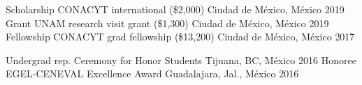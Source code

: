 \vspace{-5mm}
\begin{minipage}[t]{0.5\textwidth}
\begin{center}
\begin{cvhonors}
    \cvhonor
    {Scholarship}
    {CONACYT \textendash{} international (\approx\$2,000)}
    {Ciudad de México, México}
    {2019}
    \cvhonor
    {Grant}
    {UNAM research visit grant (\approx\$1,300)}
    {Ciudad de México, México}
    {2019}
    \cvhonor
    {Fellowship}
    {CONACYT grad fellowship (\approx\$13,200)}
    {Ciudad de México, México}
    {2017}
\end{cvhonors}
\end{center}
\end{minipage}
\begin{minipage}[t]{0.5\textwidth}
\begin{center}
\begin{cvhonors}
  \cvhonor
    {Undergrad rep.}
    {Ceremony for Honor Students}
    {Tijuana, BC, México}
    {2016}
  \cvhonor
    {Honoree}
    {EGEL-CENEVAL Excellence Award}
    {Guadalajara, Jal., México}
    {2016}
\end{cvhonors}
\end{center}
\end{minipage}
